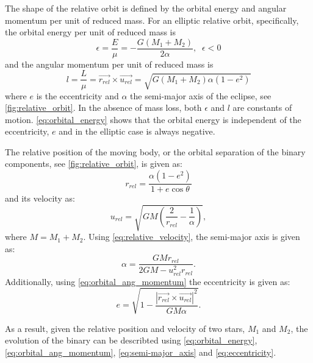 The shape of the relative orbit is defined by the orbital energy and angular momentum per unit of reduced mass. For an elliptic relative orbit, specifically, the orbital energy per unit of reduced mass is
\begin{equation}\label{eq:orbital_energy}
    \epsilon = \frac{E}{\mu} = - \frac{G (M_1 + M_2)}{2\alpha}, \; \; \epsilon  < 0
\end{equation}
and the angular momentum per unit of reduced mass is
\begin{equation}\label{eq:orbital_ang_momentum}
    l = \frac{L}{\mu} = \vec{r_{rel}} \times \vec{u_{rel}} =\sqrt{G (M_1 + M_2) \alpha (1-e^2)}
\end{equation}
where $e$ is the eccentricity and $\alpha$ the semi-major axis of the eclipse, see \cref{fig:relative_orbit}. In the absence of mass loss, both $\epsilon$ and $l$ are constants of motion.  \cref{eq:orbital_energy} shows that the orbital energy is independent of the eccentricity, $e$ and in the elliptic case is always negative.

The relative position of the moving body, or the orbital separation of the binary components, see \cref{fig:relative_orbit}, is given as:
\begin{equation}\label{eq:relative_position}
    r_{rel} = \frac{\alpha (1-e^2)}{1+e \cos{\theta}}
\end{equation}
and its velocity as:
\begin{equation}\label{eq:relative_velocity}
    u_{rel}= \sqrt{GM \left( \frac{2}{r_{rel}} - \frac{1}{\alpha}\right)},
\end{equation}
where $M = M_1 + M_2$. Using \cref{eq:relative_velocity}, the semi-major axis is given as:
\begin{equation}\label{eq:semi-major_axis}
    \alpha = \frac{GM r_{rel}}{2GM - u_{rel}^2 r_{rel}}.
\end{equation}
Additionally, using  \cref{eq:orbital_ang_momentum} the eccentricity is given as:
\begin{equation}\label{eq:eccentricity}
    e = \sqrt{1 - \frac{|\vec{r_{rel}} \times \vec{u_{rel}}|^2}{G M \alpha}}.
\end{equation}

As a result, given the relative position and velocity of two stars, $M_1$ and $M_2$, the evolution of the binary can be describted using \cref{eq:orbital_energy}, \cref{eq:orbital_ang_momentum}, \cref{eq:semi-major_axis} and \cref{eq:eccentricity}.

